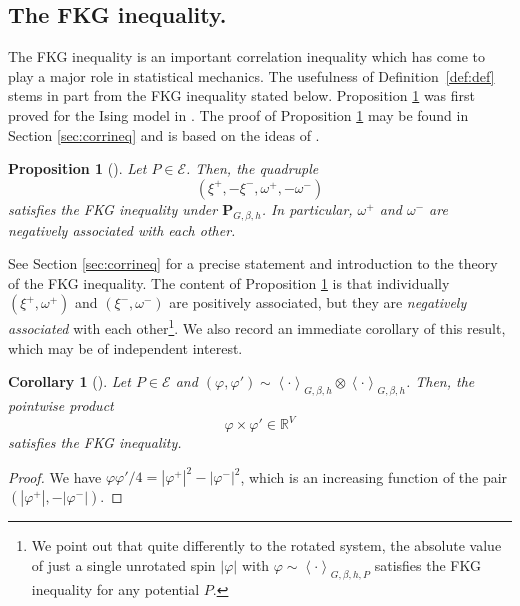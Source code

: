 \documentclass{article}
\newtheorem{proposition}[theorem]{Proposition}
\newtheorem{corollary}[theorem]{Corollary}
\numberwithin{equation}{section}
\theoremstyle{definition}
\theoremstyle{definition}
\newtheorem{definition}{Definition}
\theoremstyle{remark}
\renewcommand{\d}{\mathrm{d}}
\newcommand\vp{\varphi}
\newcommand\Ec{\mathcal{E}}
\newcommand\R{\mathbb{R}}
\renewcommand{\d}{\mathrm{d}}
\newcommand{\w}{\omega}
\renewcommand{\l}{\lambda}
\newcommand{\vpp}{\vp^+}
\newcommand{\vpm}{\vp^-}
\renewcommand{\P}{\mathrm{\mathbf{P}}}
\renewcommand{\L}{\xi}
\begin{document}
\subsection{The FKG inequality.} The FKG inequality is an important correlation inequality which has come to play a major role in statistical mechanics. The usefulness of Definition~\ref{def:def} stems in part from the FKG inequality stated below. Proposition \ref{prop:FKG} was first proved for the Ising model in \cite[Proposition 3.1]{AHL}. The proof of Proposition \ref{prop:FKG} may be found in Section \ref{sec:corrineq} and is based on the ideas of \cite[Theorem 2.8]{LamOtt}. 

\begin{proposition}[]\label{prop:FKG}
	Let $P \in \Ec$. Then, the quadruple 
	\[
		(\L^+,-\L^-,\w^+,-\w^-)
	\] 
	satisfies the FKG inequality under $\P_{G,\beta, h}$. In particular, $\w^+$ and $\w^-$ are negatively associated with each other. 
\end{proposition}
See Section \ref{sec:corrineq} for a precise statement and introduction to the theory of the FKG inequality. The content of Proposition \ref{prop:FKG} is that individually $(\L^+,\w^+)$ and $(\L^-,\w^-)$ are positively associated, but they are \emph{negatively associated} with each other{\hypersetup{linkcolor=black}\footnote{We point out that quite differently to the rotated system, the absolute value of just a single unrotated spin $|\vp|$ with $\vp \sim \left< \cdot \right>_{G,\beta,h,P}$ satisfies the FKG inequality for any potential $P$.}}.
We also record an immediate corollary of this result, which may be of independent interest.
\begin{corollary}[]
	Let $P \in \Ec$ and $(\vp,\vp') \sim \left< \cdot \right>_{G,\beta,h} \otimes \left< \cdot  \right>_{G,\beta ,h}$. Then, the pointwise product
	\[
	\vp \times \vp' \in \R^V
	\] 
	satisfies the FKG inequality.
\end{corollary}
\begin{proof}
	We have $\vp\vp'/4  =  |\vpp|^2 - |\vpm|^2$, which is an increasing function of the pair $(|\vpp|,-|\vpm|)$.
\end{proof}
\end{document}
